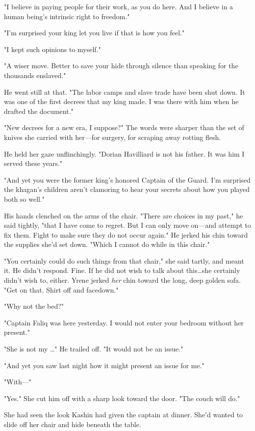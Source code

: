 "I believe in paying people for their work, as you do here.
And I believe in a human being's intrinsic right to freedom."

"I'm surprised your king let you live if that is how you feel."

"I kept such opinions to myself."

"A wiser move.
Better to save your hide through silence than speaking for the thousands enslaved."

He went still at that.
"The labor camps and slave trade have been shut down.
It was one of the first decrees that my king made.
I was there with him when he drafted the document."

"New decrees for a new era, I suppose?"
The words were sharper than the set of knives she carried with her---for surgery, for scraping away rotting flesh.

He held her gaze unflinchingly.
"Dorian Havilliard is not his father.
It was him I served these years."

"And yet you were the former king's honored Captain of the Guard.
I'm surprised the khagan's children aren't clamoring to hear your secrets about how you played both so well."

His hands clenched on the arms of the chair.
"There are choices in my past," he said tightly, "that I have come to regret.
But I can only move on---and attempt to fix them.
Fight to make sure they do not occur again."
He jerked his chin toward the supplies she'd set down.
"Which I cannot do while in this chair."

"You certainly could do such things from that chair," she said tartly, and meant it.
He didn't respond.
Fine.
If he did not wish to talk about this\ldots she certainly didn't wish to, either.
Yrene jerked \emph{her} chin toward the long, deep golden sofa.
"Get on that.
Shirt off and facedown."

"Why not the bed?"

"Captain Faliq was here yesterday.
I would not enter your bedroom without her present."

"She is not my \ldots" He trailed off.
"It would not be an issue."

"And yet you saw last night how it might present an issue for me."

"With---"

"Yes."
She cut him off with a sharp look toward the door.
"The couch will do."

She had seen the look Kashin had given the captain at dinner.
She'd wanted to slide off her chair and hide beneath the table.

